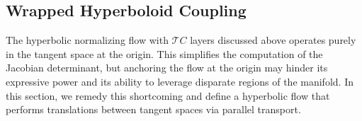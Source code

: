 \subsection{Wrapped Hyperboloid Coupling}
\label{wrapped_hyerboloid_coupling_section}
The hyperbolic normalizing flow with $\mathcal{T}C$ layers discussed above operates purely in the tangent space at the origin.
This simplifies the computation of the Jacobian determinant, but anchoring the flow at the origin may hinder its expressive power and its ability to leverage disparate regions of the manifold. 
In this section, we remedy this shortcoming and define a hyperbolic flow that performs translations between tangent spaces via parallel transport. 

